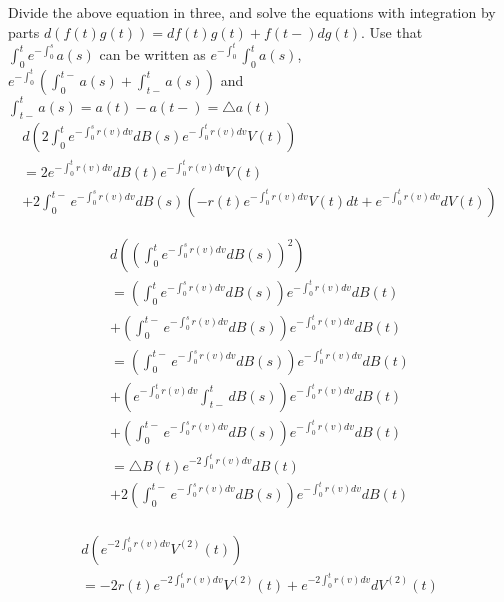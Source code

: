 \documentclass[10pt]{article}
\begin{document}
Divide the above equation in three, and solve the equations with integration by parts $d(f(t)g(t)) = df(t)g(t) + f(t-)dg(t)$. Use that $\int_0^t e^{-\int_0^s} a(s)$ can be written as $e^{-\int_0^t} \int_0^t a(s)$, $e^{-\int_0^t} (\int_0^{t-} a(s) + \int_{t-}^t a(s))$ and $\int_{t-}^t a(s) = a(t) - a(t-) = \triangle a(t)$
\begin{equation}
\begin{split}
d(2 \int_0^t {e^{-\int_0^s {r(v) dv}}dB(s) e^{-\int_0^t {r(v) dv}}} V(t)) \\
= 2e^{-\int_0^t {r(v) dv}}dB(t)e^{-\int_0^t {r(v) dv}}V(t) \\
+ 2 \int_0^{t-} e^{-\int_0^s r(v)dv} dB(s)(-r(t)e^{-\int_0^t r(v) dv}V(t)dt + e^{-\int_0^t r(v) dv} dV(t)) 
\end{split}
\end{equation}

\begin{equation}
\begin{split}
d((\int_0^t {e^{-\int_0^s {r(v) dv}}dB(s)})^2) \\
= (\int_0^t {e^{-\int_0^s {r(v) dv}}dB(s)})e^{-\int_0^t {r(v) dv}}dB(t) \\
+ (\int_0^{t-} {e^{-\int_0^s {r(v) dv}}dB(s)})e^{-\int_0^t {r(v) dv}}dB(t) \\
= (\int_0^{t-} {e^{-\int_0^s {r(v) dv}}dB(s)})e^{-\int_0^t {r(v) dv}}dB(t) \\
+ (e^{-\int_0^t {r(v) dv}}\int_{t-}^{t} {dB(s)})e^{-\int_0^t {r(v) dv}}dB(t) \\
+ (\int_0^{t-} {e^{-\int_0^s {r(v) dv}}dB(s)})e^{-\int_0^t {r(v) dv}}dB(t) \\
= \triangle B(t) e^{-2\int_0^t {r(v) dv}}dB(t) \\
+ 2(\int_0^{t-} {e^{-\int_0^s {r(v) dv}}dB(s)})e^{-\int_0^t {r(v) dv}}dB(t) \\
\end{split}
\end{equation}

\begin{equation}
\begin{split}
d(e^{-2\int_0^t {r(v) dv}} V^{(2)}(t)) \\
= -2r(t)e^{-2\int_0^t {r(v) dv}} V^{(2)}(t) + e^{-2\int_0^t {r(v) dv}} dV^{(2)}(t)
\end{split}
\end{equation}
\end{document}
